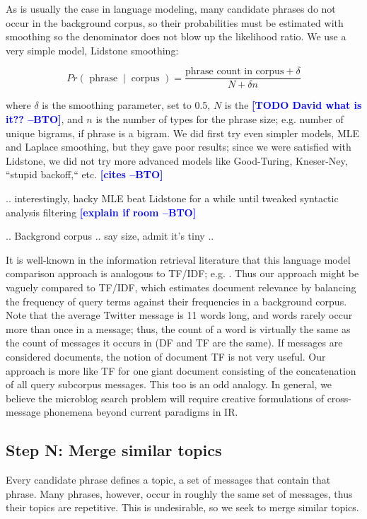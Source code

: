 \documentclass[letterpaper]{article}
\newcommand{\bto}[1]{\textcolor{blue}{\textbf{[#1 --BTO]}}}
\newcommand{\codenote}[1]{}
\begin{document}
As is usually the case in language modeling, many candidate phrases do not occur in the background corpus, so their probabilities must be estimated with smoothing so the denominator does not blow up the likelihood ratio.  We use a very simple model, Lidstone smoothing:

\[ Pr(\textrm{ phrase }\ |\ \textrm{ corpus }) = \frac
{ \textrm{phrase count in corpus} + \delta }
{ N + \delta n   }
\]

where $\delta$ is the smoothing parameter, set to 0.5, $N$ is the \bto{TODO David what is it??}, and $n$ is the number of types for the phrase size; e.g. number of unique bigrams, if phrase is a bigram.  We did first try even simpler models, MLE and Laplace smoothing, but they gave poor results; since we were satisfied with Lidstone, we did not try more advanced models like Good-Turing, Kneser-Ney, ``stupid backoff,`` etc. \bto{cites}

.. interestingly, hacky MLE beat Lidstone for a while until tweaked syntactic analysis filtering \bto{explain if room}

.. Backgrond corpus .. say size, admit it's tiny ..

It is well-known in the information retrieval literature that this  language model comparison approach is analogous to TF/IDF; e.g. \cite{manning_introduction_2008}.  Thus our approach might be vaguely compared to TF/IDF, which estimates document relevance by balancing the frequency of query terms against their frequencies in a background corpus.  Note that the average Twitter message is 11 words long, and words rarely occur more than once in a message; thus, the count of a word is virtually the same as the count of messages it occurs in (DF and TF are the same).  If messages are considered documents, the notion of document TF is not very useful.  Our approach is more like TF for one giant document consisting of the concatenation of all query subcorpus messages.  This too is an odd analogy.  In general, we believe the microblog search problem will require creative formulations of cross-message phonemena beyond current paradigms in IR.

\subsection{Step N: Merge similar topics}

\codenote{ deduper.py }
Every candidate phrase defines a topic, a set of messages that contain that phrase.  Many phrases, however, occur in roughly the same set of messages, thus their topics are repetitive.  This is undesirable, so we seek to merge similar topics.
\end{document}
